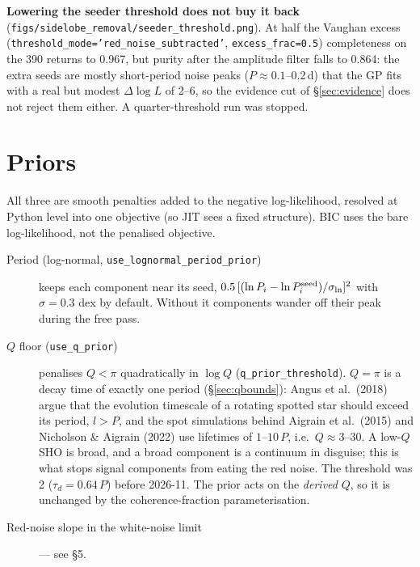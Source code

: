 \documentclass[11pt]{article}
\newcommand{\code}[1]{\texttt{#1}}
\begin{document}
\textbf{Lowering the seeder threshold does not buy it back}
(\code{figs/sidelobe\_removal/seeder\_threshold.png}). At half the Vaughan excess
(\code{threshold\_mode='red\_noise\_subtracted'}, \code{excess\_frac=0.5}) completeness on the
390 returns to 0.967, but purity after the amplitude filter falls to 0.864: the extra seeds
are mostly short-period noise peaks ($P \approx 0.1$--0.2\,d) that the GP fits with a real
but modest $\Delta\log L$ of 2--6, so the evidence cut of \S\ref{sec:evidence} does not reject
them either. A quarter-threshold run was stopped.

\section{Priors}

All three are smooth penalties added to the negative log-likelihood, resolved at Python
level into one objective (so JIT sees a fixed structure). BIC uses the bare log-likelihood,
not the penalised objective.

\begin{description}
\item[Period (log-normal, \code{use\_lognormal\_period\_prior})] keeps each component near its
  seed, $0.5\,[(\ln P_i - \ln P_i^{\rm seed})/\sigma_{\rm ln}]^2$ with $\sigma = 0.3$ dex by
  default. Without it components wander off their peak during the free pass.
\item[$Q$ floor (\code{use\_q\_prior})] penalises $Q < \pi$ quadratically in $\log Q$
  (\code{q\_prior\_threshold}). $Q = \pi$ is a decay time of exactly one period
  (\S\ref{sec:qbounds}): Angus et al.\ (2018) argue that the evolution timescale of a
  rotating spotted star should exceed its period, $l > P$, and the spot simulations behind
  Aigrain et al.\ (2015) and Nicholson \& Aigrain (2022) use lifetimes of $1$--$10\,P$, i.e.\
  $Q \approx 3$--$30$. A low-$Q$ SHO is broad, and a broad component is a continuum in
  disguise; this is what stops signal components from eating the red noise. The threshold
  was 2 ($\tau_d = 0.64\,P$) before 2026-11. The prior acts on the \emph{derived} $Q$, so it
  is unchanged by the coherence-fraction parameterisation.
\item[Red-noise slope in the white-noise limit] --- see \S5.
\end{description}
\end{document}
